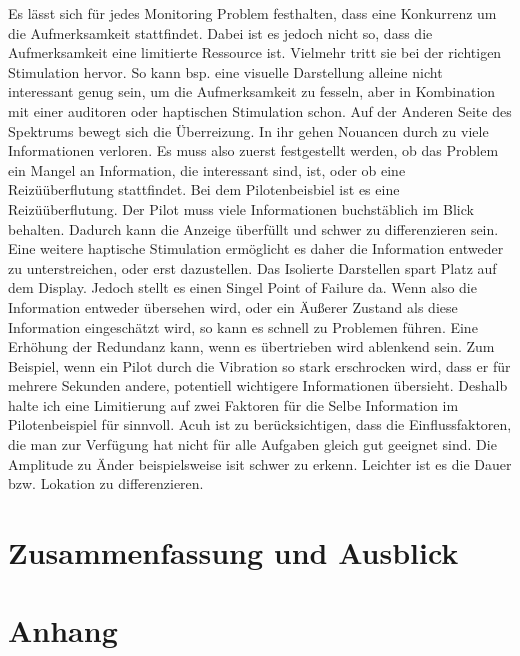 \documentclass{llncs}					%
\begin{document}
Es lässt sich für jedes Monitoring Problem festhalten, dass eine Konkurrenz um die Aufmerksamkeit stattfindet. Dabei ist es jedoch nicht so, dass die Aufmerksamkeit eine limitierte Ressource ist. Vielmehr tritt sie bei der richtigen Stimulation hervor. So kann bsp. eine visuelle Darstellung alleine nicht interessant genug sein, um die Aufmerksamkeit zu fesseln, aber in Kombination mit einer auditoren oder haptischen Stimulation schon. Auf der Anderen Seite des Spektrums bewegt sich die Überreizung. In ihr gehen Nouancen durch zu viele Informationen verloren.
Es muss also zuerst festgestellt werden, ob das Problem ein Mangel an Information, die interessant sind, ist, oder ob eine Reizüüberflutung stattfindet. Bei dem Pilotenbeisbiel ist es eine Reizüüberflutung. Der Pilot muss viele Informationen buchstäblich im Blick behalten. Dadurch kann die Anzeige überfüllt und schwer zu differenzieren sein. Eine weitere haptische Stimulation ermöglicht es daher die Information entweder zu unterstreichen, oder erst dazustellen. Das Isolierte Darstellen spart Platz auf dem Display. Jedoch stellt es einen Singel Point of Failure da. Wenn also die Information entweder übersehen wird, oder ein Äußerer Zustand als diese Information eingeschätzt wird, so kann es schnell zu Problemen führen. Eine Erhöhung der Redundanz kann, wenn es übertrieben wird ablenkend sein. Zum Beispiel, wenn ein Pilot durch die Vibration so stark erschrocken wird, dass er für mehrere Sekunden andere, potentiell wichtigere Informationen übersieht. Deshalb halte ich eine Limitierung auf zwei Faktoren für die Selbe Information im Pilotenbeispiel für sinnvoll. Acuh ist zu berücksichtigen, dass die Einflussfaktoren, die man zur Verfügung hat nicht für alle Aufgaben gleich gut geeignet sind. Die Amplitude zu Änder beispielsweise isit schwer zu erkenn. Leichter ist es die Dauer bzw. Lokation zu differenzieren.
\newpage
\section{Zusammenfassung und Ausblick}

\newpage
\section{Anhang}
\end{document}
